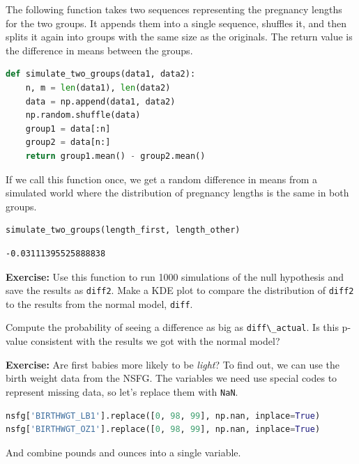 The following function takes two sequences representing the pregnancy
lengths for the two groups. It appends them into a single sequence,
shuffles it, and then splits it again into groups with the same size as
the originals. The return value is the difference in means between the
groups.

\begin{lstlisting}[language=Python,style=source]
def simulate_two_groups(data1, data2):
    n, m = len(data1), len(data2)
    data = np.append(data1, data2)
    np.random.shuffle(data)
    group1 = data[:n]
    group2 = data[n:]
    return group1.mean() - group2.mean()
\end{lstlisting}

If we call this function once, we get a random difference in means from
a simulated world where the distribution of pregnancy lengths is the
same in both groups.

\begin{lstlisting}[language=Python,style=source]
simulate_two_groups(length_first, length_other)
\end{lstlisting}

\begin{lstlisting}[style=output]
-0.03111395525888838
\end{lstlisting}

\textbf{Exercise:} Use this function to run 1000 simulations of the null
hypothesis and save the results as \passthrough{\lstinline!diff2!}. Make
a KDE plot to compare the distribution of
\passthrough{\lstinline!diff2!} to the results from the normal model,
\passthrough{\lstinline!diff!}.

Compute the probability of seeing a difference as big as
\passthrough{\lstinline!diff\_actual!}. Is this p-value consistent with
the results we got with the normal model?

\textbf{Exercise:} Are first babies more likely to be \emph{light}? To
find out, we can use the birth weight data from the NSFG. The variables
we need use special codes to represent missing data, so let's replace
them with \passthrough{\lstinline!NaN!}.

\begin{lstlisting}[language=Python,style=source]
nsfg['BIRTHWGT_LB1'].replace([0, 98, 99], np.nan, inplace=True)
nsfg['BIRTHWGT_OZ1'].replace([0, 98, 99], np.nan, inplace=True)
\end{lstlisting}

And combine pounds and ounces into a single variable.

